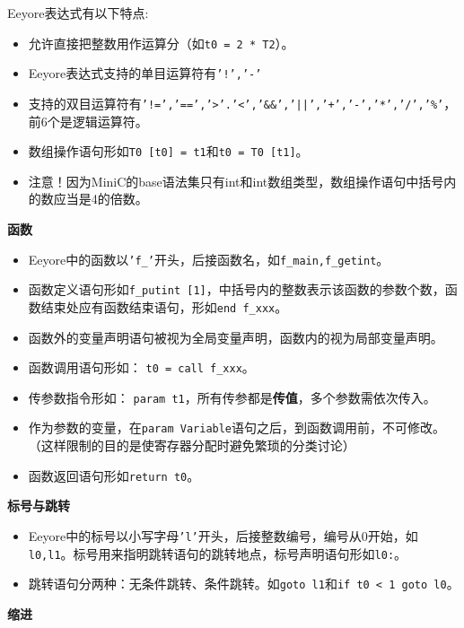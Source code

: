 
Eeyore表达式有以下特点:
\begin{itemize}

\item 
允许直接把整数用作运算分（如\texttt{t0 = 2 * T2}）。

\item
Eeyore表达式支持的单目运算符有\texttt{'!','-'}

\item 
支持的双目运算符有\texttt{'!=','==','\textgreater'.'\textless','\&\&','||','+','-','*','/','\%'}，前6个是逻辑运算符。

\item 
数组操作语句形如\texttt{T0 [t0] = t1}和\texttt{t0 = T0 [t1]}。

\item
注意！因为MiniC的base语法集只有int和int数组类型，数组操作语句中括号内的数应当是4的倍数。

\end{itemize}
\noindent \textbf{函数}
\begin{itemize}
\item 
Eeyore中的函数以\texttt{'f\_'}开头，后接函数名，如\texttt{f\_main,f\_getint}。

\item 
函数定义语句形如\texttt{f\_putint [1]}，中括号内的整数表示该函数的参数个数，函数结束处应有函数结束语句，形如\texttt{end f\_xxx}。

\item 
函数外的变量声明语句被视为全局变量声明，函数内的视为局部变量声明。

\item 
函数调用语句形如： \texttt{t0 = call f\_xxx}。

\item 
传参数指令形如： \texttt{param t1}，所有传参都是\textbf{传值}，多个参数需依次传入。

\item
作为参数的变量，在\texttt{param Variable}语句之后，到函数调用前，不可修改。（这样限制的目的是使寄存器分配时避免繁琐的分类讨论）

\item
函数返回语句形如\texttt{return t0}。
\end{itemize}
\noindent \textbf{标号与跳转}
\begin{itemize}
\item 
Eeyore中的标号以小写字母\texttt{'l'}开头，后接整数编号，编号从0开始，如\texttt{l0,l1}。标号用来指明跳转语句的跳转地点，标号声明语句形如\texttt{l0:}。

\item
跳转语句分两种：无条件跳转、条件跳转。如\texttt{goto l1}和\texttt{if t0 < 1 goto l0}。

\end{itemize}
\noindent \textbf{缩进}

